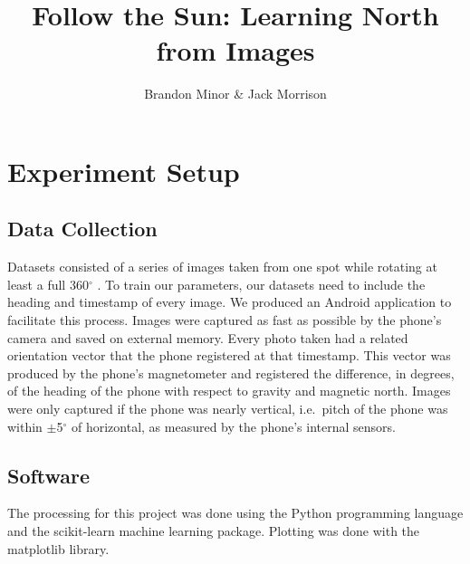 \documentclass{article}
\begin{document}
\title{Follow the Sun: Learning North from Images}
\author{Brandon Minor \& Jack Morrison}
\maketitle


\newcommand{\degrees}{$^\circ$ }


\section{Experiment Setup}

\subsection{Data Collection}
Datasets consisted of a series of images taken from one spot while rotating at least a full 360\degrees.
To train our parameters, our datasets need to include the heading and timestamp of every image. We produced an Android application to facilitate this process. Images were captured as fast as possible by the phone's camera and saved on external memory. Every photo taken had a related orientation vector that the phone registered at that timestamp. This vector was produced by the phone's magnetometer and registered the difference, in degrees, of the heading of the phone with respect to gravity and magnetic north. Images were only captured if the phone was nearly vertical, i.e.\ pitch of the phone was within $\pm$5\degrees of horizontal, as measured by the phone's internal sensors.

\subsection{Software}
The processing for this project was done using the Python programming language and the scikit-learn \cite{scikit-learn} machine learning package. Plotting was done with the matplotlib library. 
\end{document}
